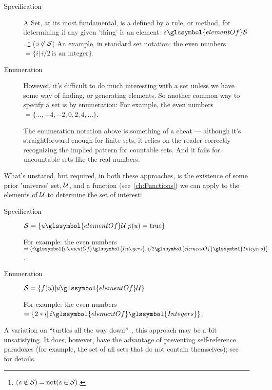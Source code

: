 \begin{description}

\item[Specification]

A \gls{Set}, at its most fundamental, is a defined by a rule,
or method,
for determining if any given 'thing' is an element: 
$s \glssymbol{elementOf} \aSet{S}$.
\footnote{$(s \notin \mathcal{S}) = \text{not}(s \in \mathcal{S})$.}
($s \not\in \mathcal{S}$)
An example, in standard set notation:
the even numbers $= \{ i | \, i/2 \, \text{is an integer}\}$.

\item[Enumeration]

However, it's difficult to do much interesting with a set
unless we have some way of finding, or generating elements.
So another common way to specify a set is by enumeration:
For example, the even numbers $= \{ \ldots, -4, -2, 0, 2 ,4,
\ldots \}$.

The enumeration notation above is something of a cheat ---
although it's straightforward enough for finite sets, it relies on
the reader correctly recognizing the implied pattern for countable
sets.
And it fails for uncountable sets like the real numbers.

\end{description}

What's unstated, but required, in both these approaches, is the
existence of some prior 'universe' set, $\mathcal{U}$, and a function
(see~\autoref{ch:Functions}) we can apply to the elements of
$\mathcal{U}$ to determine the set of interest:

\begin{description}
\item[Specification] 
$\aSet{S} =
\{ u \glssymbol{elementOf} \aSet{U} | p(u) = \text{true} \}$ 

For example: the even numbers $= \{ i \glssymbol{elementOf} 
\glssymbol{Integers} |
 \, i/2 \glssymbol{elementOf} \glssymbol{Integers} \}$.

\item[Enumeration]
$\aSet{S} =
\{ f(u) | u \glssymbol{elementOf} \aSet{U} \}$ 

For example: the even numbers $= \{ 2*i | \, i
\glssymbol{elementOf} \glssymbol{Integers} \}$.

\end{description}
A variation on 
``turtles all the way down''~\cite{xkcd:Turtles, wiki:Turtles},
this approach may be a bit unsatisfying.
It does, however, have the advantage of preventing self-reference
paradoxes (for example, 
the set of all sets that do not contain themselves); 
see~\cite[Halmos, \textit{Naive Set Theory,} section 2]
{Halmos1960Naive} for details.


